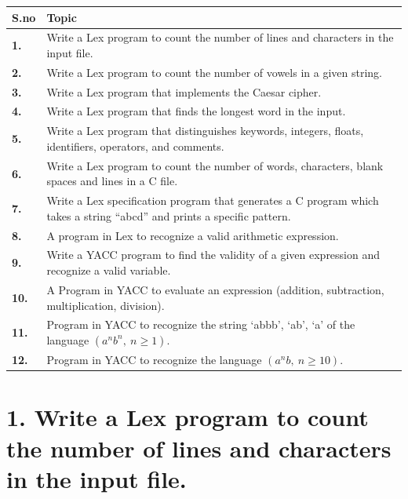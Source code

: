 \documentclass[12pt]{article}
\begin{document}
\renewcommand{\arraystretch}{1.4}
\begin{tabularx}{\textwidth}{|>{\centering\bfseries\large}p{1.5cm}|>{\large}X|}
\hline
\large\bfseries S.no & \centering\large\bfseries Topic \tabularnewline
\hline
1. & Write a Lex program to count the number of lines and characters in the input file. \\
\hline
2. & Write a Lex program to count the number of vowels in a given string. \\
\hline
3. & Write a Lex program that implements the Caesar cipher. \\
\hline
4. & Write a Lex program that finds the longest word in the input. \\
\hline
5. & Write a Lex program that distinguishes keywords, integers, floats, identifiers, operators, and comments. \\
\hline
6. & Write a Lex program to count the number of words, characters, blank spaces and lines in a C file. \\
\hline
7. & Write a Lex specification program that generates a C program which takes a string ``abcd'' and prints a specific pattern. \\
\hline
8. & A program in Lex to recognize a valid arithmetic expression. \\
\hline
9. & Write a YACC program to find the validity of a given expression and recognize a valid variable. \\
\hline
10. & A Program in YACC to evaluate an expression (addition, subtraction, multiplication, division). \\
\hline
11. & Program in YACC to recognize the string `abbb', `ab', `a' of the language $(a^n b^n,\ n\geq 1)$. \\
\hline
12. & Program in YACC to recognize the language $(a^n b,\ n\geq 10)$. \\
\hline
\end{tabularx}

\newpage
{}

\section*{\large\bfseries 1. Write a Lex program to count the number of lines and characters in the input file.}
\end{document}
